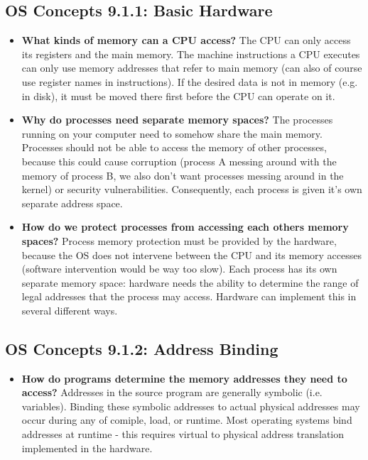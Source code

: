 \documentclass[12pt]{article}
\begin{document}
\subsection*{OS Concepts 9.1.1: Basic Hardware}

\begin{itemize}
    \item \textbf{What kinds of memory can a CPU access?} The CPU can only access its registers and the main memory. The machine instructions a CPU executes can only use memory addresses that refer to main memory (can also of course use register names in instructions). If the desired data is not in memory (e.g. in disk), it must be moved there first before the CPU can operate on it.
    \item \textbf{Why do processes need separate memory spaces?} The processes running on your computer need to somehow share the main memory. Processes should not be able to access the memory of other processes, because this could cause corruption (process A messing around with the memory of process B, we also don't want processes messing around in the kernel) or security vulnerabilities. Consequently, each process is given it's own separate address space.
    \item \textbf{How do we protect processes from accessing each others memory spaces?} Process memory protection must be provided by the hardware, because the OS does not intervene between the CPU and its memory accesses (software intervention would be way too slow). Each process has its own separate memory space: hardware needs the ability to determine the range of legal addresses that the process may access. Hardware can implement this in several different ways.
\end{itemize}

\subsection*{OS Concepts 9.1.2: Address Binding}

\begin{itemize}
    \item \textbf{How do programs determine the memory addresses they need to access?} Addresses in the source program are generally symbolic (i.e. variables). Binding these symbolic addresses to actual physical addresses may occur during any of comiple, load, or runtime. Most operating systems bind addresses at runtime - this requires virtual to physical address translation implemented in the hardware.
\end{itemize}
\end{document}
